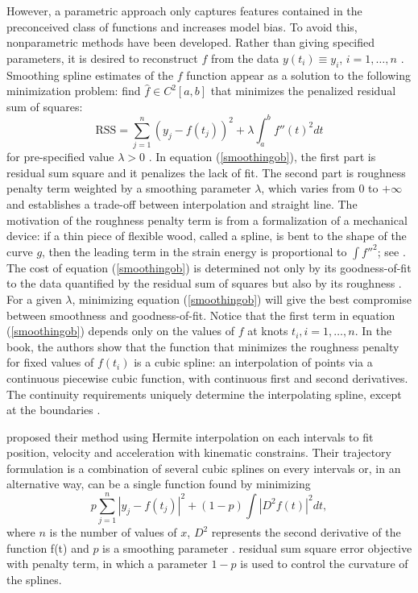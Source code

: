 However, a parametric approach only captures features contained in the preconceived class of functions \cite{yao2005functional} and increases model bias. To avoid this, nonparametric methods have been developed. Rather than giving specified parameters, it is desired to reconstruct $f$ from the data $y(t_i)\equiv y_i$, $i=1, \ldots, n$ \cite{craven1978smoothing}. Smoothing spline estimates of the $f$ function appear as a solution to the following minimization problem: find $\hat{f} \in \mathit{C}^2[a,b]$ that minimizes the penalized residual sum of squares:
\begin{equation}\label{smoothingob}
\mbox{RSS}=\sum_{j=1}^{n}\left(  y_j-f(t_j)\right) ^2+\lambda\int_{a}^{b} f''(t)^2dt
\end{equation}
for pre-specified value $\lambda>0$ \cite{aydin2012smoothing}. In equation (\ref{smoothingob}), the first part is residual sum square and it penalizes the lack of fit. The second part is roughness penalty term weighted by a smoothing parameter $\lambda$, which varies from 0 to $+\infty$ and establishes a trade-off between interpolation and straight line. The motivation of the roughness penalty term is from a formalization of a mechanical device: if a thin piece of flexible wood, called a spline, is bent to the shape of the curve $g$, then the leading term in the strain energy is proportional to $\int f''^2$; see \eg \cite{green1993nonparametric}. The cost of equation (\ref{smoothingob}) is determined not only by its goodness-of-fit to the data quantified by the residual sum of squares but also by its roughness \cite{schwarz2012geodesy}. For a given $\lambda$, minimizing equation (\ref{smoothingob}) will give the best compromise between smoothness and goodness-of-fit. Notice that the first term in equation (\ref{smoothingob}) depends only on the values of $f$ at knots $t_i, i=1, \ldots, n$. In the book, the authors \cite{green1993nonparametric} show that the function that minimizes the roughness penalty for fixed values of $f(t_i)$ is a cubic spline: an interpolation of points via a continuous piecewise cubic function, with continuous first and second derivatives. The continuity requirements uniquely determine the interpolating spline, except at the boundaries \cite{sealfon2005smoothing}.


\cite{zhang2013cubic} proposed their method using Hermite interpolation on each intervals to fit position, velocity and acceleration with kinematic constrains. Their trajectory formulation is a combination of several cubic splines on every intervals or, in an alternative way, can be a single function found by minimizing 
\begin{equation}
p\sum_{j=1}^{n}|y_j-f(t_j)|^2+(1-p)\int |D^2f(t)|^2dt,
\end{equation}
where $n$ is the number of values of $x$, $D^2$ represents the second derivative of the function f(t) and $p$ is a smoothing parameter \cite{castro2006geometric}. 
residual sum square error objective with penalty term\cite{castro2006geometric}, in which a parameter $1-p$ is used to control the curvature of the splines. 





